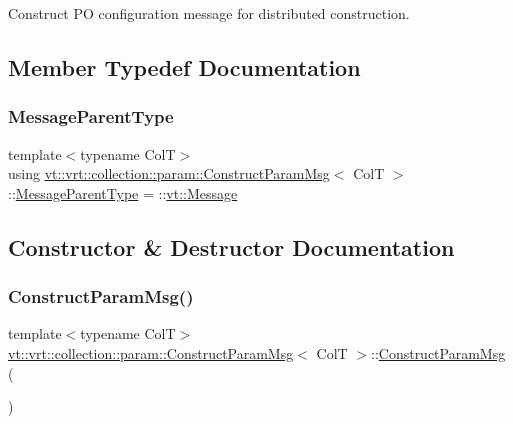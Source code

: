 Construct PO configuration message for distributed construction. 

\subsection{Member Typedef Documentation}
\mbox{\label{structvt_1_1vrt_1_1collection_1_1param_1_1_construct_param_msg_aa9be274634c6c40cf8011b01ca6a8f47}} 
\subsubsection{\texorpdfstring{Message\+Parent\+Type}{MessageParentType}}
{\footnotesize\ttfamily template$<$typename ColT$>$ \\
using \hyperlink{structvt_1_1vrt_1_1collection_1_1param_1_1_construct_param_msg}{vt\+::vrt\+::collection\+::param\+::\+Construct\+Param\+Msg}$<$ ColT $>$\+::\hyperlink{structvt_1_1messaging_1_1_active_msg_ac2e6d93267991027ce78c968b17064c7}{Message\+Parent\+Type} =  \+::\hyperlink{namespacevt_a3a3ddfef40b4c90915fa43cdd5f129ea}{vt\+::\+Message}}



\subsection{Constructor \& Destructor Documentation}
\mbox{\label{structvt_1_1vrt_1_1collection_1_1param_1_1_construct_param_msg_a1415970af3227cd834a309f96ad89c38}} 
\subsubsection{\texorpdfstring{Construct\+Param\+Msg()}{ConstructParamMsg()}\hspace{0.1cm}{\footnotesize\ttfamily [1/2]}}
{\footnotesize\ttfamily template$<$typename ColT$>$ \\
\hyperlink{structvt_1_1vrt_1_1collection_1_1param_1_1_construct_param_msg}{vt\+::vrt\+::collection\+::param\+::\+Construct\+Param\+Msg}$<$ ColT $>$\+::\hyperlink{structvt_1_1vrt_1_1collection_1_1param_1_1_construct_param_msg}{Construct\+Param\+Msg} (\begin{DoxyParamCaption}{ }\end{DoxyParamCaption})\hspace{0.3cm}{\ttfamily [default]}}

